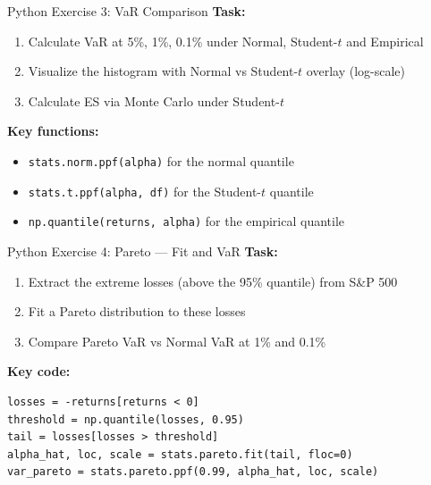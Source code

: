 \documentclass[9pt, aspectratio=169, t]{beamer}
\begin{document}
\begin{frame}[fragile]{Python Exercise 3: VaR Comparison}
    \textbf{Task:}
    \begin{enumerate}\setlength{\itemsep}{0pt}
        \item Calculate VaR at 5\%, 1\%, 0.1\% under Normal, Student-$t$ and Empirical
        \item Visualize the histogram with Normal vs Student-$t$ overlay (log-scale)
        \item Calculate ES via Monte Carlo under Student-$t$
    \end{enumerate}

    \vspace{0.3cm}
    \textbf{Key functions:}
    \begin{itemize}\setlength{\itemsep}{0pt}
        \item \texttt{stats.norm.ppf(alpha)} for the normal quantile
        \item \texttt{stats.t.ppf(alpha, df)} for the Student-$t$ quantile
        \item \texttt{np.quantile(returns, alpha)} for the empirical quantile
    \end{itemize}

\end{frame}

\begin{frame}[fragile]{Python Exercise 4: Pareto --- Fit and VaR}
    \textbf{Task:}
    \begin{enumerate}\setlength{\itemsep}{0pt}
        \item Extract the extreme losses (above the 95\% quantile) from S\&P 500
        \item Fit a Pareto distribution to these losses
        \item Compare Pareto VaR vs Normal VaR at 1\% and 0.1\%
    \end{enumerate}

    \vspace{0.3cm}
    \textbf{Key code:}
    \begin{verbatim}
losses = -returns[returns < 0]
threshold = np.quantile(losses, 0.95)
tail = losses[losses > threshold]
alpha_hat, loc, scale = stats.pareto.fit(tail, floc=0)
var_pareto = stats.pareto.ppf(0.99, alpha_hat, loc, scale)
    \end{verbatim}

\end{frame}
\end{document}
